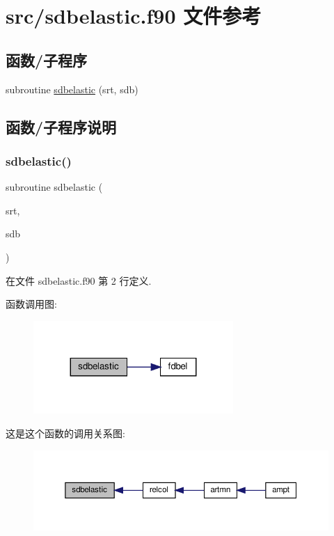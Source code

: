 \hypertarget{sdbelastic_8f90}{}\section{src/sdbelastic.f90 文件参考}
\label{sdbelastic_8f90}
\subsection*{函数/子程序}
\begin{DoxyCompactItemize}
\item 
subroutine \mbox{\hyperlink{sdbelastic_8f90_affc99362c1cca5e013a827ab1192faa0}{sdbelastic}} (srt, sdb)
\end{DoxyCompactItemize}


\subsection{函数/子程序说明}
\mbox{\label{sdbelastic_8f90_affc99362c1cca5e013a827ab1192faa0}} 
\subsubsection{\texorpdfstring{sdbelastic()}{sdbelastic()}}
{\footnotesize\ttfamily subroutine sdbelastic (\begin{DoxyParamCaption}\item[{}]{srt,  }\item[{}]{sdb }\end{DoxyParamCaption})}



在文件 sdbelastic.\+f90 第 2 行定义.

函数调用图\+:
\nopagebreak
\begin{figure}[H]
\begin{center}
\leavevmode
\includegraphics[width=215pt]{sdbelastic_8f90_affc99362c1cca5e013a827ab1192faa0_cgraph}
\end{center}
\end{figure}
这是这个函数的调用关系图\+:
\nopagebreak
\begin{figure}[H]
\begin{center}
\leavevmode
\includegraphics[width=350pt]{sdbelastic_8f90_affc99362c1cca5e013a827ab1192faa0_icgraph}
\end{center}
\end{figure}
